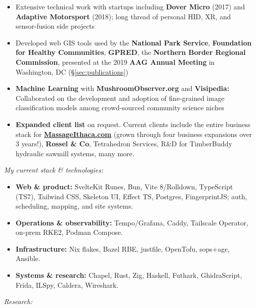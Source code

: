 \documentclass[11pt,letterpaper]{article}
\newcommand{\cvlink}[2]{\href{#1}{\color{linkcolor}#2}}
\begin{document}
\begin{itemize}
    \item Extensive technical work with startups including \textbf{Dover Micro} (2017) and \textbf{Adaptive Motorsport} (2018); long thread of personal HID, XR, and sensor-fusion side projects
    \item Developed web GIS tools used by the \textbf{National Park Service}, \textbf{Foundation for Healthy Communities}, \textbf{GPRED}, the \textbf{Northern Border Regional Commission}, presented at the 2019 \textbf{AAG Annual Meeting} in Washington, DC (\S\ref{sec:publications})
    \item \textbf{Machine Learning} with \textbf{MushroomObserver.org} and \textbf{Visipedia:} Collaborated on the development and adoption of fine-grained image classification models among crowd-sourced community science niches
    \item \textbf{Expanded client list} on request. Current clients include the entire business stack for \cvlink{https://MassageIthaca.com}{\textbf{MassageIthaca.com}} (grown through four business expansions over 3 years!), \textbf{Rossel \& Co}, Tetrahedron Services, R\&D for TimberBuddy hydraulic sawmill systems, many more.
\end{itemize}

\vspace{0.8em}

\noindent\textit{\color{muted}My current stack \& technologies:}
\begin{itemize}
    \item \textbf{Web \& product:} SvelteKit Runes, Bun, Vite 8/Rolldown, TypeScript (TS7), Tailwind CSS, Skeleton UI, Effect TS, Postgres, FingerprintJS; auth, scheduling, mapping, and site systems.
    \item \textbf{Operations \& observability:} Tempo/Grafana, Caddy, Tailscale Operator, on-prem RKE2, Podman Compose.
    \item \textbf{Infrastructure:} Nix flakes, Bazel RBE, justfile, OpenTofu, sops+age, Ansible.
    \item \textbf{Systems \& research:} Chapel, Rust, Zig, Haskell, Futhark, GhidraScript, Frida, ILSpy, Caldera, Wireshark.
\end{itemize}

\vspace{0.5em}

\noindent\textit{\color{muted}Research:}
\end{document}
